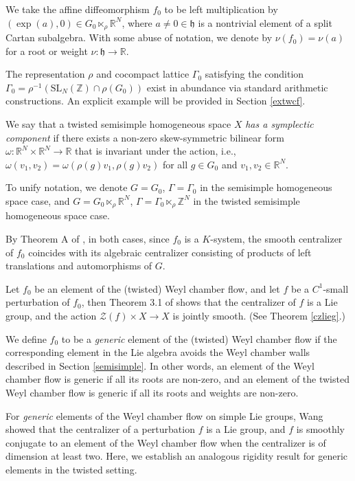 \documentclass[11pt]{amsart}
\numberwithin{equation}{section}
\newcommand{\R}{\mathbb{R}}
\theoremstyle{plain}
\begin{document}
\begin{enumerate}
    We take the affine diffeomorphism \(f_0\) to be left multiplication by \((\exp(a), 0) \in G_0 \ltimes_\rho \mathbb{R}^N\), where \(a\neq 0\in \mathfrak h\) is a nontrivial element of a split Cartan subalgebra. With some abuse of notation, we denote by $\nu(f_0)=\nu(a)$ for a root or weight $\nu:\mathfrak h\to \R$. 

    The representation $\rho$ and cocompact lattice $\Gamma_0$ satisfying the condition \(\Gamma_0=\rho^{-1}(\mathrm{SL}_N(\mathbb{Z})\cap \rho(G_0))\) exist in abundance via standard arithmetic constructions. An explicit example will be provided in Section \ref{extwcf}.

    We say that a twisted semisimple homogeneous space \(X\) \emph{has a symplectic component} if there exists a non-zero skew-symmetric bilinear form \(\omega: \mathbb{R}^N \times \mathbb{R}^N \to \mathbb{R}\) that is invariant under the action, i.e., \(\omega(v_1, v_2) = \omega(\rho(g)v_1, \rho(g)v_2)\) for all \(g \in G_0\) and \(v_1, v_2 \in \mathbb{R}^N\).
\end{enumerate}

To unify notation, we denote \(G = G_0\), \(\Gamma = \Gamma_0\) in the semisimple homogeneous space case, and \(G = G_0 \ltimes_\rho \mathbb{R}^N\), \(\Gamma = \Gamma_0 \ltimes_\rho \mathbb{Z}^N\) in the twisted semisimple homogeneous space case.

By Theorem A of \cite{DWWX}, in both cases, since $f_0$ is a $K$-system, the smooth centralizer of \(f_0\) coincides with its algebraic centralizer consisting of products of left translations and automorphisms of $G$. 

Let $f_0$ be an element of the (twisted) Weyl chamber flow, and let $f$ be a $C^1$-small perturbation of $f_0$, then Theorem 3.1 of \cite{Wang} shows that the centralizer of $f$ is a Lie group, and the action $\mathcal{Z}(f)\times X\to X$ is jointly smooth. (See Theorem \ref{czlieg}.)

We define \(f_0\) to be a \emph{generic} element of the (twisted) Weyl chamber flow if the corresponding element in the Lie algebra avoids the Weyl chamber walls described in Section \ref{semisimple}. In other words, an element of the Weyl chamber flow is generic if all its roots are non-zero, and an element of the twisted Weyl chamber flow is generic if all its roots and weights are non-zero.

For \emph{generic} elements of the Weyl chamber flow on simple Lie groups, Wang \cite{Wang} showed that the centralizer of a perturbation \(f\) is a Lie group, and \(f\) is smoothly conjugate to an element of the Weyl chamber flow when the centralizer is of dimension at least two. Here, we establish an analogous rigidity result for generic elements in the twisted setting.
\end{document}
